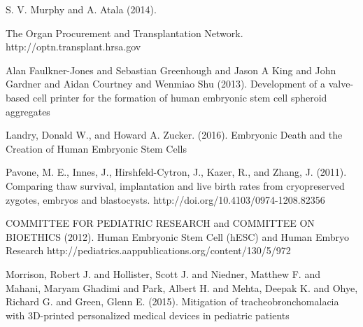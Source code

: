 \documentclass[12pt]{article} %
\begin{document}
\begin{thebibliography}{99} %
\begin{small}
\newblock S. V. Murphy and A. Atala (2014).

\newblock The Organ Procurement and Transplantation Network.
\newblock http://optn.transplant.hrsa.gov

\newblock Alan Faulkner-Jones and Sebastian Greenhough and Jason A King and John Gardner and Aidan Courtney and Wenmiao Shu (2013).
\newline Development of a valve-based cell printer for the formation of human embryonic stem cell spheroid aggregates

\newblock Landry, Donald W., and Howard A. Zucker. (2016).
\newline Embryonic Death and the Creation of Human Embryonic Stem Cells

\newblock Pavone, M. E., Innes, J., Hirshfeld-Cytron, J., Kazer, R., and Zhang, J. (2011).
\newline Comparing thaw survival, implantation and live birth rates from cryopreserved zygotes, embryos and blastocysts. 
\newblock http://doi.org/10.4103/0974-1208.82356

\newblock COMMITTEE FOR PEDIATRIC RESEARCH and COMMITTEE ON BIOETHICS (2012).
\newline Human Embryonic Stem Cell (hESC) and Human Embryo Research
\newblock http://pediatrics.aappublications.org/content/130/5/972

\newblock Morrison, Robert J. and Hollister, Scott J. and Niedner, Matthew F. and Mahani, Maryam Ghadimi and Park, Albert H. and Mehta, Deepak K. and Ohye, Richard G. and Green, Glenn E. (2015).
\newline Mitigation of tracheobronchomalacia with 3D-printed personalized medical devices in pediatric patients


\end{small}
\end{thebibliography}
\end{document}
